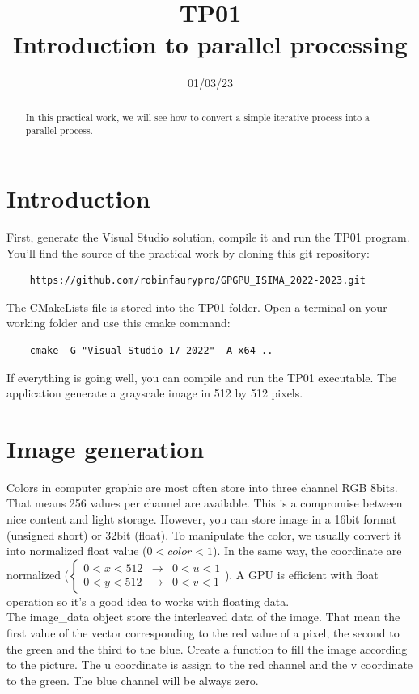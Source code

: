 \documentclass{article}
\begin{document}
\title{TP01\\Introduction to parallel processing}
\date{01/03/23}
\maketitle

\begin{abstract}
	In this practical work, we will see how to convert a simple iterative process into a parallel process.
\end{abstract}


\section{Introduction}
First, generate the Visual Studio solution, compile it and run the TP01 program.
You'll find the source of the practical work by cloning this git repository:
\begin{lstlisting}
	https://github.com/robinfaurypro/GPGPU_ISIMA_2022-2023.git
\end{lstlisting}
The CMakeLists file is stored into the TP01 folder. Open a terminal on your working folder and use this cmake command:
\begin{lstlisting}
	cmake -G "Visual Studio 17 2022" -A x64 ..
\end{lstlisting}
If everything is going well, you can compile and run the TP01 executable. The application generate a grayscale image in 512 by 512 pixels.

\section{Image generation}
Colors in computer graphic are most often store into three channel RGB 8bits. That means 256 values per channel are available. This is a compromise between nice content and light storage. However, you can store image in a 16bit format (unsigned short) or 32bit (float). To manipulate the color, we usually convert it into normalized float value ($0 < color < 1$). In the same way, the coordinate are normalized ($\left\{
\begin{array}{rcr}
0<x<512 & \rightarrow & 0<u<1 \\
0<y<512 & \rightarrow & 0<v<1 
\end{array}
\right.$).
A GPU is efficient with float operation so it's a good idea to works with floating data.\\
The image\_data object store the interleaved data of the image. That mean the first value of the vector corresponding to the red value of a pixel, the second to the green and the third to the blue. Create a function to fill the image according to the picture. The u coordinate is assign to the red channel and the v coordinate to the green. The blue channel will be always zero.
\end{document}
